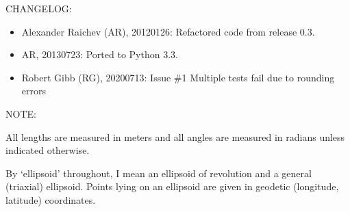 \documentclass[a4paper,12ptopenany,oneside,english]{sphinxmanual}
\begin{document}
\sphinxAtStartPar
CHANGELOG:
\begin{itemize}
\item {} 
\sphinxAtStartPar
Alexander Raichev (AR), 2012\sphinxhyphen{}01\sphinxhyphen{}26: Refactored code from release 0.3.

\item {} 
\sphinxAtStartPar
AR, 2013\sphinxhyphen{}07\sphinxhyphen{}23: Ported to Python 3.3.

\item {} 
\sphinxAtStartPar
Robert Gibb (RG), 2020\sphinxhyphen{}07\sphinxhyphen{}13: Issue \#1 Multiple tests fail due to rounding errors

\end{itemize}

\sphinxAtStartPar
NOTE:

\sphinxAtStartPar
All lengths are measured in meters and all angles are measured in radians
unless indicated otherwise.

\sphinxAtStartPar
By ‘ellipsoid’ throughout, I mean an ellipsoid of revolution and  a general (triaxial) ellipsoid.
Points lying on an ellipsoid are given in geodetic (longitude, latitude) coordinates.
\end{document}
